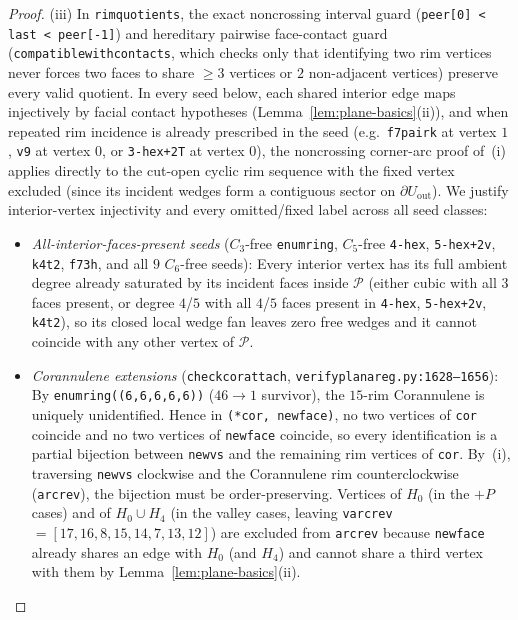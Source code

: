 \documentclass[11pt,reqno]{amsart}
\theoremstyle{plain}
\theoremstyle{definition}
\theoremstyle{remark}
\DeclareRobustCommand{\_}{\ifmmode\text{\textunderscore}\else\textunderscore\allowbreak\fi}
\begin{document}
\begin{proof}
(iii) In \texttt{rim\_quotients}, the exact noncrossing interval guard (\texttt{peer[0] < last < peer[-1]}) and hereditary pairwise face-contact guard (\texttt{compatible\_with\_contacts}, which checks only that identifying two rim vertices never forces two faces to share $\ge 3$ vertices or $2$ non-adjacent vertices) preserve every valid quotient. In every seed below, each shared interior edge maps injectively by facial contact hypotheses (Lemma~\ref{lem:plane-basics}(ii)), and when repeated rim incidence is already prescribed in the seed (e.g.\ \texttt{f7\_pair\_k} at vertex $1$, \texttt{v9} at vertex $0$, or \texttt{3-hex+2T} at vertex $0$), the noncrossing corner-arc proof of~(i) applies directly to the cut-open cyclic rim sequence with the fixed vertex excluded (since its incident wedges form a contiguous sector on $\partial U_{\mathrm{out}}$). We justify interior-vertex injectivity and every omitted/fixed label across all seed classes:
\begin{itemize}[leftmargin=1.5em]
  \item \emph{All-interior-faces-present seeds} ($C_3$-free \texttt{enum\_ring}, $C_5$-free \texttt{4-hex}, \texttt{5-hex+2v}, \texttt{k4t2}, \texttt{f7\_3h}, and all $9$ $C_6$-free seeds): Every interior vertex has its full ambient degree already saturated by its incident faces inside $\mathcal{P}$ (either cubic with all $3$ faces present, or degree $4$/$5$ with all $4$/$5$ faces present in \texttt{4-hex}, \texttt{5-hex+2v}, \texttt{k4t2}), so its closed local wedge fan leaves zero free wedges and it cannot coincide with any other vertex of $\mathcal{P}$.
  \item \emph{Corannulene extensions} (\texttt{check\_cor\_attach}, \texttt{verify\_planar\_eg.py:1628--1656}): By \texttt{enum\_ring((6,6,6,6,6))} ($46 \to 1$ survivor), the $15$-rim Corannulene is uniquely unidentified. Hence in \texttt{(*cor, new\_face)}, no two vertices of \texttt{cor} coincide and no two vertices of \texttt{new\_face} coincide, so every identification is a partial bijection between \texttt{new\_vs} and the remaining rim vertices of \texttt{cor}. By~(i), traversing \texttt{new\_vs} clockwise and the Corannulene rim counterclockwise (\texttt{arc\_rev}), the bijection must be order-preserving. Vertices of $H_0$ (in the $+P$ cases) and of $H_0 \cup H_4$ (in the valley cases, leaving \texttt{v\_arc\_rev}$=[17,16,8,15,14,7,13,12]$) are excluded from \texttt{arc\_rev} because \texttt{new\_face} already shares an edge with $H_0$ (and $H_4$) and cannot share a third vertex with them by Lemma~\ref{lem:plane-basics}(ii).

\end{itemize}
\end{proof}
\end{document}
